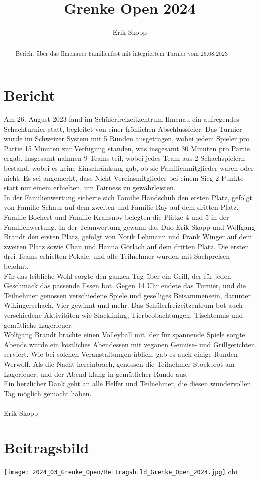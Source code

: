 \documentclass[a4paper,ngerman]{tui-algo-seminar}
\title{Grenke Open 2024}
\author{Erik Skopp}
\begin{document}
\maketitle

\begin{abstract}
Bericht über das Ilmenauer Familienfest mit integriertem Turnier vom 26.08.2023
\end{abstract}

\section{Bericht}
Am 26. August 2023 fand im Schülerfreizeitzentrum Ilmenau ein aufregendes Schachturnier statt, begleitet von einer fröhlichen Abschlussfeier. Das Turnier wurde im Schweizer System mit 5 Runden ausgetragen, wobei jedem Spieler pro Partie 15 Minuten zur Verfügung standen, was insgesamt 30 Minuten pro Partie ergab. Insgesamt nahmen 9 Teams teil, wobei jedes Team aus 2 Schachspielern bestand, wobei es keine Einschränkung gab, ob sie Familienmitglieder waren oder nicht. Es sei angemerkt, dass Nicht-Vereinsmitglieder bei einem Sieg 2 Punkte statt nur einem erhielten, um Fairness zu gewährleisten.\\
In der Familienwertung sicherte sich Familie Handschuh den ersten Platz, gefolgt von Familie Schnur auf dem zweiten und Familie Ray auf dem dritten Platz. Familie Bochert und Familie Kransnov belegten die Plätze 4 und 5 in der Familienwertung. In der Teamwertung gewann das Duo Erik Skopp und Wolfgang Brandt den ersten Platz, gefolgt von Norik Lehmann und Frank Winger auf dem zweiten Platz sowie Chau und Hanna Görlach auf dem dritten Platz. Die ersten drei Teams erhielten Pokale, und alle Teilnehmer wurden mit Sachpreisen belohnt.\\
Für das leibliche Wohl sorgte den ganzen Tag über ein Grill, der für jeden Geschmack das passende Essen bot. Gegen 14 Uhr endete das Turnier, und die Teilnehmer genossen verschiedene Spiele und geselliges Beisammensein, darunter Wikingerschach, Vier gewinnt und mehr. Das Schülerfreizeitzentrum bot auch verschiedene Aktivitäten wie Slacklining, Tierbeobachtungen, Tischtennis und gemütliche Lagerfeuer.\\
Wolfgang Brandt brachte einen Volleyball mit, der für spannende Spiele sorgte. Abends wurde ein köstliches Abendessen mit veganen Gemüse- und Grillgerichten serviert. Wie bei solchen Veranstaltungen üblich, gab es auch einige Runden Werwolf. Als die Nacht hereinbrach, genossen die Teilnehmer Stockbrot am Lagerfeuer, und der Abend klang in gemütlicher Runde aus.\\
Ein herzlicher Dank geht an alle Helfer und Teilnehmer, die diesen wundervollen Tag möglich gemacht haben.\\ 
\\
Erik Skopp

\section{Beitragsbild}
\begin{center}
\texttt{[image: 2024\_03\_Grenke\_Open/Beitragsbild\_Grenke\_Open\_2024.jpg]} 
\label{fig:ohnefloat}
ohi
\end{center}
\end{document}
